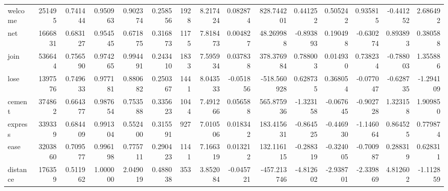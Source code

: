 \begin{tabular}{lrrrrrrrrrrrrrr}
welcome   &    251495 &  0.741444 &      0.950963 &    0.902374 &  0.258556 &  1928 &  8.217424 &  0.082874 &  828.744201 &  0.441252 &  0.505242 &  0.935815 &     -0.441252 &         2.686492 \\
net       &   1666831 &  0.683127 &      0.954545 &    0.671875 &  0.316873 &  1175 &  7.818473 &  0.004827 &   48.269988 & -0.893893 &  0.190498 & -0.630274 &      0.893893 &         0.380588 \\
join      &    536644 &  0.756590 &      0.974265 &    0.994491 &  0.243410 &  1833 &  7.595934 &  0.037838 &  378.376984 &  0.788003 &  0.014930 &  0.738234 &     -0.788003 &         1.355886 \\
lose      &   1397576 &  0.749633 &      0.977181 &    0.880682 &  0.250367 &  1441 &  8.043533 & -0.051856 & -518.560928 &  0.628735 &  0.368054 & -0.077047 &     -0.628735 &        -1.294109 \\
cement    &    374862 &  0.664377 &      0.987654 &    0.753588 &  0.335623 &  1044 &  7.491266 &  0.056588 &  565.875936 & -1.323158 & -0.067645 & -0.902728 &      1.323158 &         1.909850 \\
express   &    339339 &  0.684409 &      0.991304 &    0.552400 &  0.315591 &   927 &  7.010506 &  0.018342 &  183.415631 & -0.864525 & -0.446930 & -1.146064 &      0.864525 &         0.779874 \\
ease      &   3203860 &  0.709577 &      0.996198 &    0.775711 &  0.290423 &  1141 &  7.166319 &  0.013212 &  132.116115 & -0.288319 & -0.324005 & -0.700987 &      0.288319 &         0.628311 \\
distance  &    176359 &  0.511962 &      1.000000 &    2.049019 &  0.488038 &   353 &  3.852084 & -0.045721 & -457.213746 & -4.812602 & -2.938701 & -2.339869 &      4.812602 &        -1.112859 \\
\bottomrule
\end{tabular}
